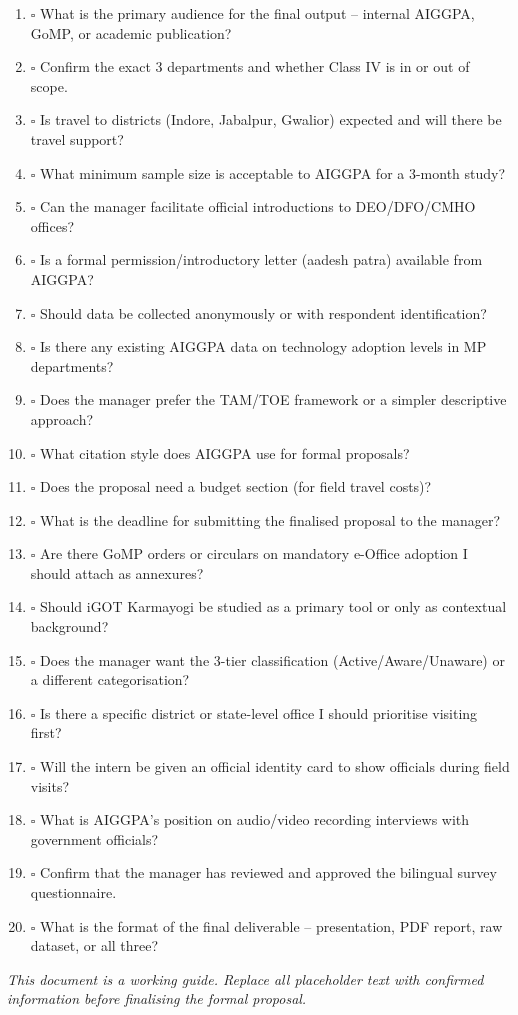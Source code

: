 \documentclass[12pt,a4paper]{article}
\begin{document}
\begin{tcolorbox}[colback=alertred!8,colframe=alertred,title=\textbf{Complete this checklist before finalising the proposal},fonttitle=\small\bfseries]
\small
\begin{enumerate}[leftmargin=1.5em,label=\arabic*.]
  \item $\square$ What is the primary audience for the final output -- internal AIGGPA, GoMP, or academic publication?
  \item $\square$ Confirm the exact 3 departments and whether Class IV is in or out of scope.
  \item $\square$ Is travel to districts (Indore, Jabalpur, Gwalior) expected and will there be travel support?
  \item $\square$ What minimum sample size is acceptable to AIGGPA for a 3-month study?
  \item $\square$ Can the manager facilitate official introductions to DEO/DFO/CMHO offices?
  \item $\square$ Is a formal permission/introductory letter (aadesh patra) available from AIGGPA?
  \item $\square$ Should data be collected anonymously or with respondent identification?
  \item $\square$ Is there any existing AIGGPA data on technology adoption levels in MP departments?
  \item $\square$ Does the manager prefer the TAM/TOE framework or a simpler descriptive approach?
  \item $\square$ What citation style does AIGGPA use for formal proposals?
  \item $\square$ Does the proposal need a budget section (for field travel costs)?
  \item $\square$ What is the deadline for submitting the finalised proposal to the manager?
  \item $\square$ Are there GoMP orders or circulars on mandatory e-Office adoption I should attach as annexures?
  \item $\square$ Should iGOT Karmayogi be studied as a primary tool or only as contextual background?
  \item $\square$ Does the manager want the 3-tier classification (Active/Aware/Unaware) or a different categorisation?
  \item $\square$ Is there a specific district or state-level office I should prioritise visiting first?
  \item $\square$ Will the intern be given an official identity card to show officials during field visits?
  \item $\square$ What is AIGGPA's position on audio/video recording interviews with government officials?
  \item $\square$ Confirm that the manager has reviewed and approved the bilingual survey questionnaire.
  \item $\square$ What is the format of the final deliverable -- presentation, PDF report, raw dataset, or all three?
\end{enumerate}
\end{tcolorbox}

\vspace{0.3cm}
\begin{center}
\small\textit{This document is a working guide. Replace all placeholder text with confirmed information before finalising the formal proposal.}
\end{center}
\end{document}
